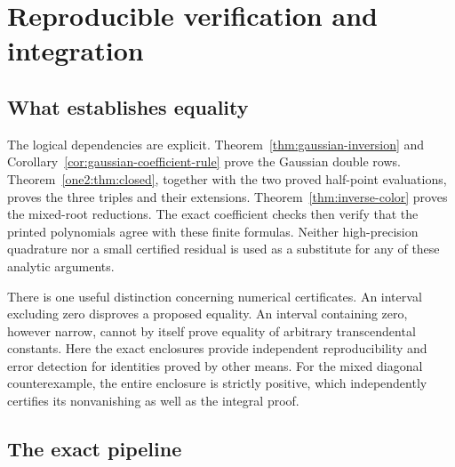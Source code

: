 \section{Reproducible verification and integration}
\label{sec:verification}

\subsection{What establishes equality}

The logical dependencies are explicit. Theorem~\ref{thm:gaussian-inversion}
and Corollary~\ref{cor:gaussian-coefficient-rule} prove the Gaussian
double rows. Theorem~\ref{one2:thm:closed}, together with the two proved
half-point evaluations, proves the three triples and their extensions.
Theorem~\ref{thm:inverse-color} proves the mixed-root reductions.
The exact coefficient checks then verify that the printed polynomials
agree with these finite formulas. Neither high-precision quadrature
nor a small certified residual is used as a substitute for any of
these analytic arguments.

There is one useful distinction concerning numerical certificates.
An interval excluding zero disproves a proposed equality. An interval
containing zero, however narrow, cannot by itself prove equality of
arbitrary transcendental constants. Here the exact enclosures provide
independent reproducibility and error detection for identities proved
by other means. For the mixed diagonal counterexample, the entire
enclosure is strictly positive, which independently certifies its
nonvanishing as well as the integral proof.

\subsection{The exact pipeline}

